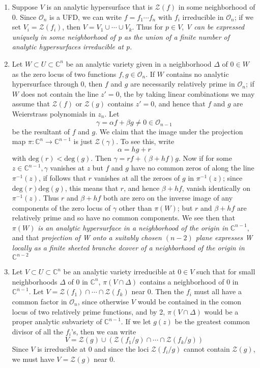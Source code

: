 \documentclass{article}
\begin{document}
\begin{enumerate}
	\item Suppose $V$ is an analytic hypersurface that is $ \mathcal{Z}(f)$ in some neighborhood of $0$. Since $ \mathcal{O}_n$ is a UFD, we can write $f = f_1 \cdots f_n$ with $f_i$ irreducible in $ \mathcal{O}_n$; if we set $V_i = \mathcal{Z}(f_i)$, then $V = V_1 \cup \cdots \cup V_k$. Thus for $ p \in V$, \textit{V can be expressed uniquely in some neighborhood of p as the union of a finite number of analytic hypersurfaces irreducible at p.}
	\item Let $W \subset U \subset \mathbb{C}^n$ be an analytic variety given in a neighborhood $\Delta$ of $0 \in W$ as the zero locus of two functions $f,g \in \mathcal{O}_n$. If $W$ contains no analytic hypersurface through 0, then $f$ and $g$ are necessarily relatively prime in $ \mathcal{O}_n$; if $W$ does not contain the line $z' = 0$, the by taking linear combinations we may assume that $ \mathcal{Z}(f)$ or $ \mathcal{Z}(g)$ contains $z' = 0$, and hence that $f$ and $g$ are Weierstrass polynomials in $z_n$. Let
\[
	\gamma = \alpha f + \beta g \neq 0 \in \mathcal{O}_{n-1}
\]
be the resultant of $f$ and $g$. We claim that the image under the projection map $
\pi: \mathbb{C}^n \to \mathbb{C}^{n-1}$ is just $ \mathcal{Z}( \gamma )$. To see this, write
\[
\alpha = hg + r
\]
with $ \mathrm{deg}(r) < \mathrm{deg}(g)$. Then $\gamma = rf + (\beta + hf) g$. Now if for some $z \in \mathbb{C}^{n-1}, \gamma$ vanishes at $z$ but $f$ and $g$ have no common zeros of along the line $\pi^{-1}(z)$, if follows that $r$ vanishes at all the zeroes of $g$ in $\pi^{-1}(z)$; since $\mathrm{deg}(r)  \mathrm{deg}(g)$, this means that $r$, and hence $ \beta + hf$, vanish identically on $\pi^{-1}(z)$. Thus $r$ and $\beta + hf$ both are zero on the inverse image of any components of the zero locus of $ \gamma$ other than $\pi(W)$; but $r$ and $\beta + hf$ are relatively prime and so have no common components. We see then that $\pi(W)$ \textit{is an analytic hypersurface in a neighborhood of the origin in} $ \mathbb{C}^{n-1}$, and that \textit{projection of W  onto a suitably chosen $(n-2)$ plane expresses W locally as a finite sheeted branche dcover of a neighborhood of the origin in} $ \mathbb{C}^{n-2}$
\item Let $V \subset U \subset \mathbb{C}^n$ be an analytic variety irreducible at $0 \in V$ such that for small neighborhoods $\Delta$ of 0 in $ \mathbb{C}^n$, $\pi(V \cap \Delta)$ contains a neighborhood of 0 in $ \mathbb{C}^{n-1}$. Let $V = \mathcal{Z}(f_1) \cap \cdots \cap \mathcal{Z}(f_k)$ near 0. Then the $f_i$ must all have a common factor in $ \mathcal{O}_n$, since otherwise $V$ would be contained in the comon locus of two relatively prime functions, and by 2, $\pi(V \cap \Delta)$ would be a proper analytic subvariety of $ \mathbb{C}^{n-1}$. If we let $g(z)$ be the greatest common divisor of all the $f_i$'s, then we can write
\[
	V = \mathcal{Z}(g) \cup \left( \mathcal{Z}(f_1/g) \cap \cdots \cap \mathcal{Z}(f_k/g) \right) 
\]
Since $V$ is irreducible at 0 and since the loci $ \mathcal{Z}(f_i/g)$ cannot contain $ \mathcal{Z}(g)$, we must have $V = \mathcal{Z}(g)$ near 0.


\end{enumerate}
\end{document}
